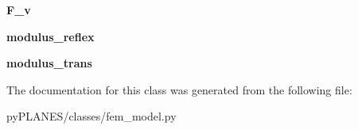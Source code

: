 \begin{DoxyCompactItemize}
{\bfseries F\+\_\+v}
\item 
\mbox{\label{classpy_p_l_a_n_e_s_1_1classes_1_1fem__model_1_1_fem_model_a1ddf343343b66acf18e7b9a03ece9dcd}} 
{\bfseries modulus\+\_\+reflex}
\item 
\mbox{\label{classpy_p_l_a_n_e_s_1_1classes_1_1fem__model_1_1_fem_model_a245f534453513881cd07e617f02603af}} 
{\bfseries modulus\+\_\+trans}
\end{DoxyCompactItemize}


The documentation for this class was generated from the following file\+:\begin{DoxyCompactItemize}
\item 
py\+P\+L\+A\+N\+E\+S/classes/fem\+\_\+model.\+py\end{DoxyCompactItemize}
